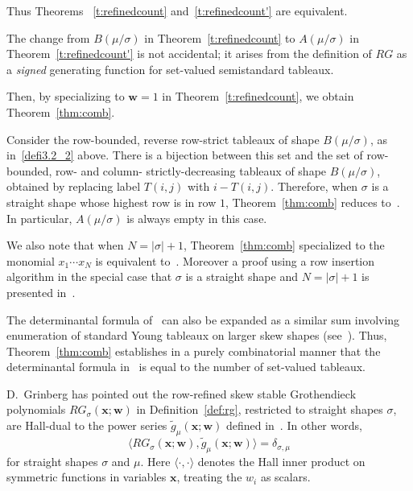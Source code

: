 \documentclass[ALCO,ThmDefs,Unicode,epreuves]{cedram}
\newcommand{\bfw}{\mathbf{w}}
\begin{document}
Thus Theorems ~\ref{t:refinedcount} and~\ref{t:refinedcount'} are equivalent.

\begin{rema}
The change from $B(\mu/\sigma)$ in Theorem~\ref{t:refinedcount} to $A(\mu/\sigma)$ in Theorem~\ref{t:refinedcount'} is not accidental; it arises from the definition of $RG$ as a \emph{signed} generating function for set-valued semistandard tableaux.
\end{rema}

Then, by specializing to $\bfw = 1$ in Theorem~\ref{t:refinedcount}, we obtain Theorem~\ref{thm:comb}.



\begin{rema} \label{rem:connection-to-lenart}
Consider the row-bounded, reverse row-strict tableaux of shape $B(\mu/\sigma)$, as in~\eqref{defi3.2_2} above. There is a bijection between this set and the set of row-bounded, row- and column- strictly-decreasing tableaux of shape $B(\mu/\sigma)$, obtained by replacing label $T(i,j)$ with $i-T(i,j)$. Therefore, when $\sigma$ is a straight shape whose highest row is in row $1$, Theorem~\ref{thm:comb} reduces to~\cite[Theorem~2.2]{lenart-combinatorial}. In particular, $A(\mu/\sigma)$ is always empty in this case. 

We also note that when $N=|\sigma|+1$, Theorem~\ref{thm:comb} specialized to the monomial $x_1\cdots x_N$ is equivalent to~\cite[Theorem~2.8]{clpt}.
Moreover a proof using a row insertion algorithm in the special case that $\sigma$ is a straight shape and $N=|\sigma|+1$ is presented in~\cite[Proposition~3.9]{reiner-tenner-yong}.
\end{rema}




\begin{rema}\label{rem:connection-to-act}
The determinantal formula of~\cite{anderson-chen-tarasca-k-classes} can also be expanded as a similar sum involving enumeration of standard Young tableaux on larger skew shapes (see~\cite[Theorem~C]{anderson-chen-tarasca-k-classes}).
Thus, Theorem~\ref{thm:comb} establishes in a purely combinatorial manner that the determinantal formula in~\cite{anderson-chen-tarasca-k-classes} is equal to the number of set-valued tableaux.
\end{rema}

\begin{rema}\label{rem:darij}
D.~Grinberg has pointed out the row-refined skew stable Grothendieck polynomials $RG_\sigma(\mathbf{x};\mathbf{w})$ in Definition~\ref{def:rg}, restricted to straight shapes $\sigma$, are Hall-dual to the power series $\tilde{g}_{\mu}(\mathbf{x};\mathbf{w})$ defined in~\cite{galashin-grinberg-liu-refined}. In other words, 
\[
\langle RG_\sigma(\mathbf{x};\mathbf{w}), \tilde{g}_\mu(\mathbf{x};\mathbf{w})\rangle = \delta_{\sigma,\mu}
\]
for straight shapes $\sigma$ and $\mu$. Here $\langle\cdot,\cdot\rangle$ denotes the Hall inner product on symmetric functions in variables $\mathbf{x}$, treating the $w_i$ as scalars. 
\end{rema}
\end{document}
